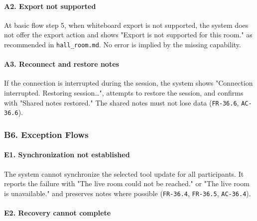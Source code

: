 \documentclass[12pt]{article}
\begin{document}
\hypertarget{sec:a2-export-not-supported}{}
\paragraph*{A2. Export not supported}
\par\medskip

At basic flow step 5, when whiteboard export is not supported, the system does not offer the export action and shows "Export is not supported for this room." as recommended in \texttt{hall\_room.md}. No error is implied by the missing capability.
\par\medskip

\hypertarget{sec:a3-reconnect-and-restore-notes}{}
\paragraph*{A3. Reconnect and restore notes}
\par\medskip

If the connection is interrupted during the session, the system shows "Connection interrupted. Restoring session…", attempts to restore the session, and confirms with "Shared notes restored." The shared notes must not lose data (\texttt{FR-36.6}, \texttt{AC-36.6}).
\par\medskip

\hypertarget{sec:b6-exception-flows}{}
\subsubsection*{B6. Exception Flows}
\par\medskip

\hypertarget{sec:e1-synchronization-not-established}{}
\paragraph*{E1. Synchronization not established}
\par\medskip

The system cannot synchronize the selected tool update for all participants. It reports the failure with "The live room could not be reached." or "The live room is unavailable." and preserves notes where possible (\texttt{FR-36.4}, \texttt{FR-36.5}, \texttt{AC-36.4}).
\par\medskip

\hypertarget{sec:e2-recovery-cannot-complete}{}
\paragraph*{E2. Recovery cannot complete}
\par\medskip
\end{document}
